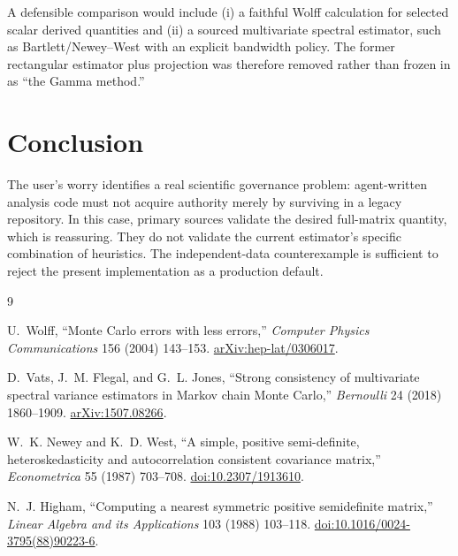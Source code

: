 \documentclass[11pt]{article}
\begin{document}
A defensible comparison would include (i) a faithful Wolff calculation for
selected scalar derived quantities and (ii) a sourced multivariate
spectral estimator, such as Bartlett/Newey--West with an explicit bandwidth
policy. The former rectangular estimator plus projection was therefore
removed rather than frozen in as ``the Gamma method.''

\section{Conclusion}

The user's worry identifies a real scientific governance problem: agent-written
analysis code must not acquire authority merely by surviving in a legacy
repository. In this case, primary sources validate the desired full-matrix
quantity, which is reassuring. They do not validate the current estimator's
specific combination of heuristics. The independent-data counterexample is
sufficient to reject the present implementation as a production default.

\begin{thebibliography}{9}

U.~Wolff,
``Monte Carlo errors with less errors,''
\emph{Computer Physics Communications} 156 (2004) 143--153.
\href{https://arxiv.org/abs/hep-lat/0306017}{arXiv:hep-lat/0306017}.

D.~Vats, J.~M. Flegal, and G.~L. Jones,
``Strong consistency of multivariate spectral variance estimators in Markov
chain Monte Carlo,''
\emph{Bernoulli} 24 (2018) 1860--1909.
\href{https://arxiv.org/abs/1507.08266}{arXiv:1507.08266}.

W.~K. Newey and K.~D. West,
``A simple, positive semi-definite, heteroskedasticity and autocorrelation
consistent covariance matrix,''
\emph{Econometrica} 55 (1987) 703--708.
\href{https://doi.org/10.2307/1913610}{doi:10.2307/1913610}.

N.~J. Higham,
``Computing a nearest symmetric positive semidefinite matrix,''
\emph{Linear Algebra and its Applications} 103 (1988) 103--118.
\href{https://doi.org/10.1016/0024-3795(88)90223-6}{doi:10.1016/0024-3795(88)90223-6}.

\end{thebibliography}
\end{document}

